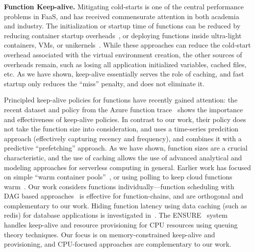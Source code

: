 \label{sec:related}
\vspace*{\subsecspace}


\noindent \textbf{Function Keep-alive.}
Mitigating cold-starts is one of the central performance problems in FaaS, and has received commensurate attention in both academia and industry.
%
The initialization or startup time of functions can be reduced  by reducing container startup overheads~\cite{oakes_sock_2018,mohan_agile_2019, akkus_sand_2018}, or deploying functions inside ultra-light containers, VMs, or unikernels~\cite{unikernels,firecracker-nsdi20}.
%
While these approaches can reduce the cold-start overhead associated with the virtual environment creation, the other sources of overheads remain, such as losing all application initialized variables, cached files, etc.
As we have shown, keep-alive essentially serves the role of caching, and fast startup only reduces the ``miss'' penalty, and does not eliminate it.


Principled keep-alive policies for functions have recently gained attention: the recent dataset and policy from the Azure function trace~\cite{shahrad_serverless_2020} shows the importance and effectiveness of keep-alive policies. 
In contrast to our work, their policy does not take the function size into consideration, and uses a time-series predcition approach (effectively capturing recency and frequency), and combines it with a predictive ``prefetching'' approach. 
As we have shown, function sizes are a crucial characteristic, and the use of caching allows the use of advanced analytical and modeling approaches for serverless computing in general. 
%
Earlier work has focused on simple ``warm container pools''~\cite{lin_mitigating_2019}, or using polling to keep cloud functions warm~\cite{warm2,warm1}. 
%
Our work considers functions individually---function scheduling with DAG based approaches~\cite{carver_search_2019} is effective for function-chains, and are orthogonal and complementary to our work. 
%
Hiding function latency using data caching (such as redis) for database applications is investigated in~\cite{ghosh_caching_2019}. 
The ENSURE~\cite{ensure_acsos20} system handles keep-alive and resource provisioning for CPU resources using queuing theory techniques.
Our focus is on memory-constrained keep-alive and provisioning, and CPU-focused approaches are complementary to our work. 

